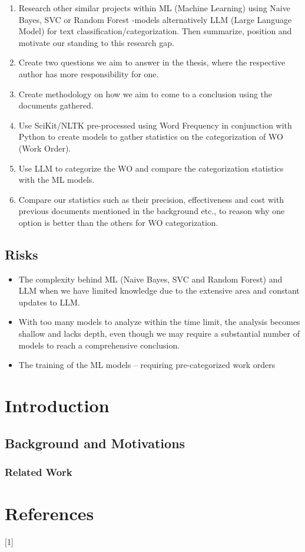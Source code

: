 \documentclass{article}
\begin{document}
\begin{enumerate}
      \item Research other similar projects within ML (Machine Learning) using Naive Bayes,
            SVC or Random Forest -models alternatively LLM (Large Language Model) for text
            classification/categorization. Then summarize, position and motivate our standing to
            this research gap.
      \item Create two questions we aim to answer in the thesis, where the respective author
            has more responsibility for one.
      \item Create methodology on how we aim to come to a conclusion using the documents gathered.
      \item Use SciKit/NLTK pre-processed using Word Frequency in conjunction with Python
            to create models to gather statistics on the categorization of WO (Work Order).
      \item Use LLM to categorize the WO and compare the categorization statistics
            with the ML models.
      \item Compare our statistics such as their precision,
            effectiveness and cost with previous documents mentioned in the background etc.,
            to reason why one option is better than the others for WO categorization.
\end{enumerate}

\subsection{Risks}

\begin{itemize}
      \item The complexity behind ML (Naive Bayes, SVC and Random Forest) and LLM when
            we have limited knowledge due to the extensive area and constant updates to LLM.
      \item With too many models to analyze within the time limit, the analysis becomes
            shallow and lacks depth, even though we may require a substantial number of models
            to reach a comprehensive conclusion.
      \item The training of the ML models -- requiring pre-categorized work orders
\end{itemize}

\section{Introduction}

\subsection{Background and Motivations}

\subsubsection{Related Work}

\section{References}

 [1]
\end{document}
